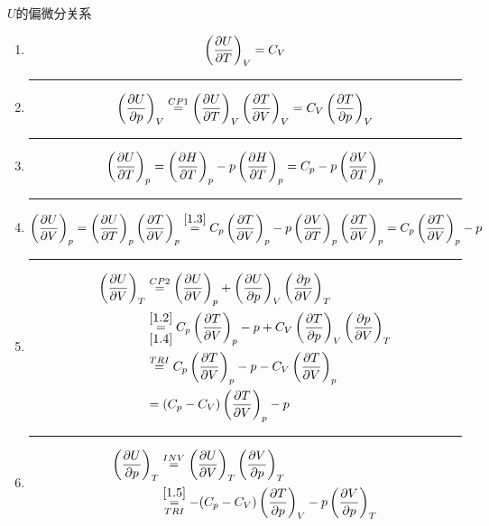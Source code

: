 \begin{example}
    \(U\)的偏微分关系
    \begin{enumerate}
        \item \[\left(\frac{\partial U}{\partial T}\right)_V =C_V
        \]
        \hrule
        \item\label{1.2} \[\left(\frac{\partial U}{\partial p}\right)_V
        \overset{CP1}{=}\left(\frac{\partial U}{\partial T}\right)_V\left(\frac{\partial T}{\partial V}\right)_V
        =C_V\left(\frac{\partial T}{\partial p}\right)_V
        \]
        \hrule
        \item\label{1.3} \[\left(\frac{\partial U}{\partial T}\right)_p
        =\left(\frac{\partial H}{\partial T}\right)_p
        -p\left(\frac{\partial H}{\partial T}\right)_p
        =C_p -p\left(\frac{\partial V}{\partial T}\right)_p
        \]
        \hrule
        \item\label{1.4} \[\left(\frac{\pa U}{\pa V}\right)_p=
        \left(\frac{\pa U}{\pa T}\right)_p\left(\frac{\pa T}{\pa V}\right)_p
        \overset{\ref*{1.3}}{=}
        C_p \left(\frac{\pa T}{\pa V}\right)_p-p\left(\frac{\pa V}{\pa T}\right)_p\left(\frac{\pa T}{\pa V}\right)_p
        =C_p \left(\frac{\pa T}{\pa V}\right)_p-p
        \]
        \hrule
        \item\label{1.5} \begin{align*}
            \left(\frac{\pa U}{\pa V}\right)_T 
            &\overset{CP2}{=}\left(\frac{\pa U}{\pa V}\right)_p+
            \left(\frac{\pa U}{\pa p}\right)_V\left(\frac{\pa p}{\pa V}\right)_T\\
            &\overunderset{\ref*{1.2}}{\ref*{1.4}}{=}
            C_p\left(\frac{\pa T}{\pa V}\right)_p-p+C_V 
            \left(\frac{\pa T}{\pa p}\right)_V\left(\frac{\pa p}{\pa V}\right)_T \\
            &\overset{TRI}{=}C_p\left(\frac{\pa T}{\pa V}\right)_p-p -C_V 
            \left(\frac{\pa T}{\pa V}\right)_p \\
            &=(C_p-C_V)\left(\frac{\pa T}{\pa V}\right)_p-p
        \end{align*}
        \hrule
        \item \begin{align*}
            \left(\frac{\pa U}{\pa p}\right)_T
            &\overset{INV}{=}\left(\frac{\pa U}{\pa V}\right)_T\left(\frac{\pa V}{\pa p}\right)_T\\
            &\overunderset{\ref*{1.5}}{TRI}{=}
            -(C_p-C_V)\left(\frac{\pa T}{\pa p}\right)_V-p\left(\frac{\pa V}{\pa p}\right)_T
        \end{align*}
    \end{enumerate}
\end{example}
